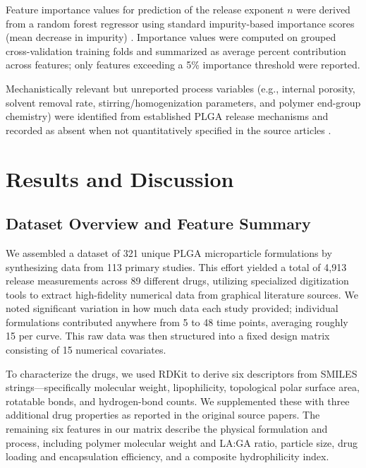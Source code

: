 \documentclass[preprint,12pt,authoryear]{elsarticle}
\begin{document}
Feature importance values for prediction of the release exponent $n$ were derived from a random forest regressor using standard impurity-based importance scores (mean decrease in impurity) \citep{Breiman2001RF}. Importance values were computed on grouped cross-validation training folds and summarized as average percent contribution across features; only features exceeding a 5\% importance threshold were reported.

Mechanistically relevant but unreported process variables (e.g., internal porosity, solvent removal rate, stirring/homogenization parameters, and polymer end-group chemistry) were identified from established PLGA release mechanisms and recorded as absent when not quantitatively specified in the source articles \citep{Fredenberg2011,FreibergZhu2004,Jain2000,KloseSiepmann2006Porosity,Yoo2020Burst}.

\section{Results and Discussion}

\subsection{Dataset Overview and Feature Summary}

We assembled a dataset of 321 unique PLGA microparticle formulations by synthesizing data from 113 primary studies. This effort yielded a total of 4,913 release measurements across 89 different drugs, utilizing specialized digitization tools to extract high-fidelity numerical data from graphical literature sources. We noted significant variation in how much data each study provided; individual formulations contributed anywhere from 5 to 48 time points, averaging roughly 15 per curve. This raw data was then structured into a fixed design matrix consisting of 15 numerical covariates.

To characterize the drugs, we used RDKit to derive six descriptors from SMILES strings---specifically molecular weight, lipophilicity, topological polar surface area, rotatable bonds, and hydrogen-bond counts. We supplemented these with three additional drug properties as reported in the original source papers. The remaining six features in our matrix describe the physical formulation and process, including polymer molecular weight and LA:GA ratio, particle size, drug loading and encapsulation efficiency, and a composite hydrophilicity index.
\end{document}
